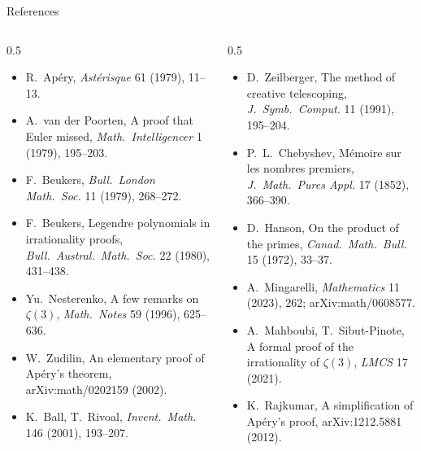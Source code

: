 \documentclass[aspectratio=169,11pt]{beamer}
\begin{document}
\begin{frame}{References}
  \scriptsize
  \begin{columns}[T]
    \begin{column}{0.5\textwidth}
      \begin{itemize}\setlength\itemsep{1pt}
        \item R.~Ap\'ery, \emph{Ast\'erisque} 61 (1979), 11--13.
        \item A.~van der Poorten, A proof that Euler missed, \emph{Math.\ Intelligencer} 1 (1979), 195--203.
        \item F.~Beukers, \emph{Bull.\ London Math.\ Soc.} 11 (1979), 268--272.
        \item F.~Beukers, Legendre polynomials in irrationality proofs, \emph{Bull.\ Austral.\ Math.\ Soc.} 22 (1980), 431--438.
        \item Yu.~Nesterenko, A few remarks on $\zeta(3)$, \emph{Math.\ Notes} 59 (1996), 625--636.
        \item W.~Zudilin, An elementary proof of Ap\'ery's theorem, arXiv:math/0202159 (2002).
        \item K.~Ball, T.~Rivoal, \emph{Invent.\ Math.} 146 (2001), 193--207.
      \end{itemize}
    \end{column}
    \begin{column}{0.5\textwidth}
      \begin{itemize}\setlength\itemsep{1pt}
        \item D.~Zeilberger, The method of creative telescoping, \emph{J.\ Symb.\ Comput.} 11 (1991), 195--204.
        \item P.~L.~Chebyshev, M\'emoire sur les nombres premiers, \emph{J.\ Math.\ Pures Appl.} 17 (1852), 366--390.
        \item D.~Hanson, On the product of the primes, \emph{Canad.\ Math.\ Bull.} 15 (1972), 33--37.
        \item A.~Mingarelli, \emph{Mathematics} 11 (2023), 262; arXiv:math/0608577.
        \item A.~Mahboubi, T.~Sibut-Pinote, A formal proof of the irrationality of $\zeta(3)$, \emph{LMCS} 17 (2021).
        \item K.~Rajkumar, A simplification of Ap\'ery's proof, arXiv:1212.5881 (2012).
      \end{itemize}
    \end{column}
  \end{columns}
\end{frame}
\end{document}

